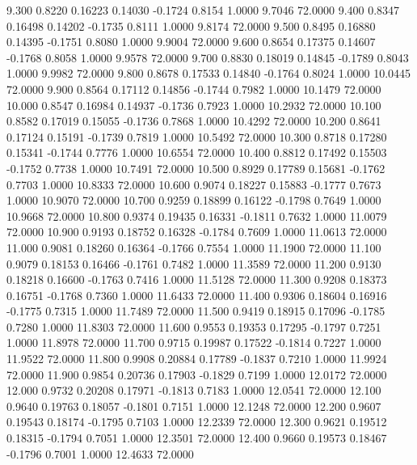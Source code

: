    9.300   0.8220   0.16223   0.14030  -0.1724   0.8154   1.0000   9.7046  72.0000
   9.400   0.8347   0.16498   0.14202  -0.1735   0.8111   1.0000   9.8174  72.0000
   9.500   0.8495   0.16880   0.14395  -0.1751   0.8080   1.0000   9.9004  72.0000
   9.600   0.8654   0.17375   0.14607  -0.1768   0.8058   1.0000   9.9578  72.0000
   9.700   0.8830   0.18019   0.14845  -0.1789   0.8043   1.0000   9.9982  72.0000
   9.800   0.8678   0.17533   0.14840  -0.1764   0.8024   1.0000  10.0445  72.0000
   9.900   0.8564   0.17112   0.14856  -0.1744   0.7982   1.0000  10.1479  72.0000
  10.000   0.8547   0.16984   0.14937  -0.1736   0.7923   1.0000  10.2932  72.0000
  10.100   0.8582   0.17019   0.15055  -0.1736   0.7868   1.0000  10.4292  72.0000
  10.200   0.8641   0.17124   0.15191  -0.1739   0.7819   1.0000  10.5492  72.0000
  10.300   0.8718   0.17280   0.15341  -0.1744   0.7776   1.0000  10.6554  72.0000
  10.400   0.8812   0.17492   0.15503  -0.1752   0.7738   1.0000  10.7491  72.0000
  10.500   0.8929   0.17789   0.15681  -0.1762   0.7703   1.0000  10.8333  72.0000
  10.600   0.9074   0.18227   0.15883  -0.1777   0.7673   1.0000  10.9070  72.0000
  10.700   0.9259   0.18899   0.16122  -0.1798   0.7649   1.0000  10.9668  72.0000
  10.800   0.9374   0.19435   0.16331  -0.1811   0.7632   1.0000  11.0079  72.0000
  10.900   0.9193   0.18752   0.16328  -0.1784   0.7609   1.0000  11.0613  72.0000
  11.000   0.9081   0.18260   0.16364  -0.1766   0.7554   1.0000  11.1900  72.0000
  11.100   0.9079   0.18153   0.16466  -0.1761   0.7482   1.0000  11.3589  72.0000
  11.200   0.9130   0.18218   0.16600  -0.1763   0.7416   1.0000  11.5128  72.0000
  11.300   0.9208   0.18373   0.16751  -0.1768   0.7360   1.0000  11.6433  72.0000
  11.400   0.9306   0.18604   0.16916  -0.1775   0.7315   1.0000  11.7489  72.0000
  11.500   0.9419   0.18915   0.17096  -0.1785   0.7280   1.0000  11.8303  72.0000
  11.600   0.9553   0.19353   0.17295  -0.1797   0.7251   1.0000  11.8978  72.0000
  11.700   0.9715   0.19987   0.17522  -0.1814   0.7227   1.0000  11.9522  72.0000
  11.800   0.9908   0.20884   0.17789  -0.1837   0.7210   1.0000  11.9924  72.0000
  11.900   0.9854   0.20736   0.17903  -0.1829   0.7199   1.0000  12.0172  72.0000
  12.000   0.9732   0.20208   0.17971  -0.1813   0.7183   1.0000  12.0541  72.0000
  12.100   0.9640   0.19763   0.18057  -0.1801   0.7151   1.0000  12.1248  72.0000
  12.200   0.9607   0.19543   0.18174  -0.1795   0.7103   1.0000  12.2339  72.0000
  12.300   0.9621   0.19512   0.18315  -0.1794   0.7051   1.0000  12.3501  72.0000
  12.400   0.9660   0.19573   0.18467  -0.1796   0.7001   1.0000  12.4633  72.0000
